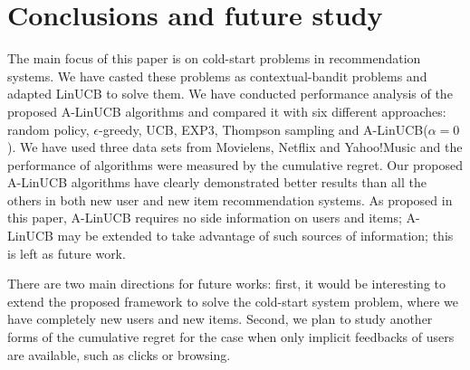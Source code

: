 \documentclass[twoside,leqno,twocolumn]{article}
\newcommand{\jm}[1]{{\color{TealBlue}(jm) #1\color{black}}}
\begin{document}
\section{Conclusions and future study} 

The main focus of this paper is on cold-start problems in recommendation systems. We
have casted these problems as contextual-bandit problems and adapted LinUCB to solve
them. We have conducted performance analysis of the proposed A-LinUCB algorithms and compared it
with six different approaches: random policy, $\epsilon$-greedy, UCB, EXP3, Thompson sampling and
A-LinUCB($\alpha=0$). We have used three data sets from Movielens, Netflix and Yahoo!Music and the
performance of algorithms were measured by the cumulative regret. Our proposed A-LinUCB algorithms
have clearly demonstrated better results than all the others in both new user and new item
recommendation systems. As proposed in this paper, A-LinUCB requires no side information on users and items; A-LinUCB may be extended to take advantage of such sources of information; this is left as future work. %

There are two main directions for future works: first, it would be interesting to extend the proposed framework to solve the cold-start system problem, where we have completely new users and new items. Second, we plan to study another forms of the cumulative regret for the case when only implicit feedbacks of users are available, such as clicks or browsing. 


\end{document}
